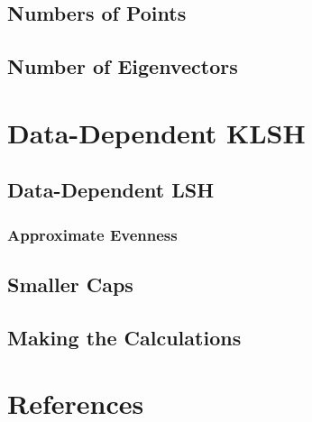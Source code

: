 \documentclass[twoside,11pt]{homework}
\begin{document}
\subsection{Numbers of Points}

\subsection{Number of Eigenvectors}

\section{Data-Dependent KLSH} %

\subsection{Data-Dependent LSH}

\subsubsection{Approximate Evenness}

\subsection{Smaller Caps}

\subsection{Making the Calculations}

\section{References}
\end{document}
